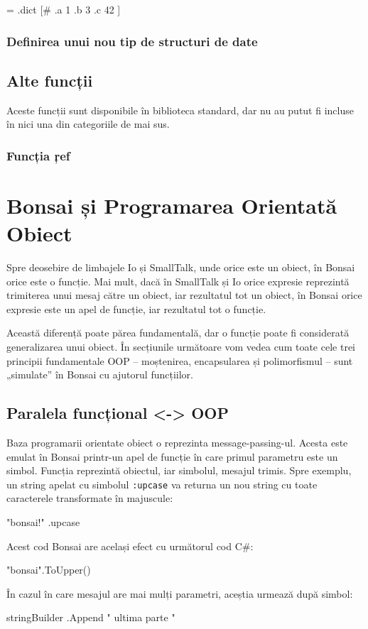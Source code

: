 \documentclass[12pt,a4paper]{memoir}
\begin{document}
\begin{code}
= .dict [# 
  .a 1 
  .b 3
  .c 42 
]
\end{code}

\subsection{Definirea unui nou tip de structuri de date}


\section{Alte funcții}

Aceste funcții sunt disponibile în biblioteca standard, dar nu au putut fi incluse în nici una din categoriile de mai sus.

\subsection{Funcția \c{ref}}


\chapter{Bonsai și Programarea Orientată Obiect}

Spre deosebire de limbajele Io\cite{io} și SmallTalk\cite{smalltalk}, unde orice este un obiect, în Bonsai orice este o funcție. Mai mult, dacă în SmallTalk și Io orice expresie reprezintă trimiterea unui mesaj către un obiect, iar rezultatul tot un obiect, în Bonsai orice expresie este un apel de funcție, iar rezultatul tot o funcție.

Această diferență poate părea fundamentală, dar o funcție poate fi considerată generalizarea unui obiect. În secțiunile următoare vom vedea cum toate cele trei principii fundamentale OOP – moștenirea, encapsularea și polimorfismul – sunt „simulate” în Bonsai cu ajutorul funcțiilor.

\section{Paralela funcțional <-> OOP}

Baza programarii orientate obiect o reprezinta message-passing-ul. Acesta este emulat în Bonsai printr-un apel de funcție în care primul parametru este un simbol. Funcția reprezintă obiectul, iar simbolul, mesajul trimis. Spre exemplu, un string apelat cu simbolul \texttt{:upcase} va returna un nou string cu toate caracterele transformate în majuscule:
\begin{code}
"bonsai!" .upcase
\end{code}
Acest cod Bonsai are același efect cu următorul cod C\#:
\begin{code}
"bonsai".ToUpper()
\end{code}
În cazul în care mesajul are mai mulți parametri, aceștia urmează după simbol:
\begin{code}
stringBuilder .Append " ultima parte "
\end{code}
\end{document}
